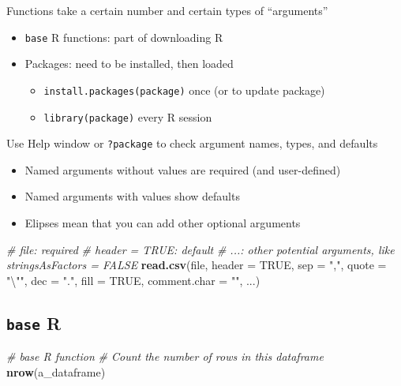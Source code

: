 \documentclass[
]{book}
\newenvironment{Shaded}{\begin{snugshade}}{\end{snugshade}}
\newcommand{\CharTok}[1]{\textcolor[rgb]{0.31,0.60,0.02}{#1}}
\newcommand{\CommentTok}[1]{\textcolor[rgb]{0.56,0.35,0.01}{\textit{#1}}}
\newcommand{\DataTypeTok}[1]{\textcolor[rgb]{0.13,0.29,0.53}{#1}}
\newcommand{\KeywordTok}[1]{\textcolor[rgb]{0.13,0.29,0.53}{\textbf{#1}}}
\newcommand{\NormalTok}[1]{#1}
\newcommand{\OtherTok}[1]{\textcolor[rgb]{0.56,0.35,0.01}{#1}}
\newcommand{\StringTok}[1]{\textcolor[rgb]{0.31,0.60,0.02}{#1}}
\providecommand{\tightlist}{%
  \setlength{\itemsep}{0pt}\setlength{\parskip}{0pt}}
\begin{document}
Functions take a certain number and certain types of ``arguments''

\begin{itemize}
\tightlist
\item
  \texttt{base} R functions: part of downloading R
\item
  Packages: need to be installed, then loaded

  \begin{itemize}
  \tightlist
  \item
    \texttt{install.packages(package)} once (or to update package)
  \item
    \texttt{library(package)} every R session
  \end{itemize}
\end{itemize}

Use Help window or \texttt{?package} to check argument names, types, and defaults

\begin{itemize}
\tightlist
\item
  Named arguments without values are required (and user-defined)
\item
  Named arguments with values show defaults
\item
  Elipses mean that you can add other optional arguments
\end{itemize}

\begin{Shaded}
\begin{Highlighting}[]
\CommentTok{# file: required}
\CommentTok{# header = TRUE: default}
\CommentTok{# ...: other potential arguments, like stringsAsFactors = FALSE}
\KeywordTok{read.csv}\NormalTok{(file, }\DataTypeTok{header =} \OtherTok{TRUE}\NormalTok{, }\DataTypeTok{sep =} \StringTok{","}\NormalTok{, }\DataTypeTok{quote =} \StringTok{"}\CharTok{\textbackslash{}"}\StringTok{"}\NormalTok{,}
         \DataTypeTok{dec =} \StringTok{"."}\NormalTok{, }\DataTypeTok{fill =} \OtherTok{TRUE}\NormalTok{, }\DataTypeTok{comment.char =} \StringTok{""}\NormalTok{, ...)}
\end{Highlighting}
\end{Shaded}

\hypertarget{base-r}{%
\subsection{\texorpdfstring{\texttt{base} R}{base R}}\label{base-r}}

\begin{Shaded}
\begin{Highlighting}[]
\CommentTok{# base R function}
\CommentTok{# Count the number of rows in this dataframe}
\KeywordTok{nrow}\NormalTok{(a_dataframe)}
\end{Highlighting}
\end{Shaded}
\end{document}
